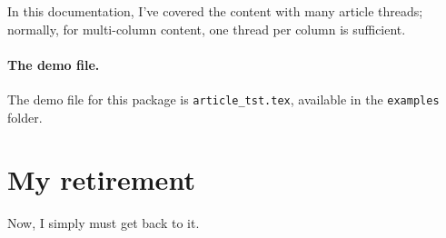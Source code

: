 \documentclass{article}
\begin{document}
\newtopic\noindent In this documentation, I've covered the content with many article threads; normally,
for multi-column content, one thread per column is sufficient.
\begin{multicols}{2} %
\noindent{}\indent
\lipsum[2]

\lipsum[4]

\lipsum[6]

\noindent{}\indent
\lipsum[7]

\lipsum[10]

\lipsum[12]

\noindent{}\indent
\lipsum[14]

\noindent{}\indent
\lipsum[16]

\end{multicols}

\paragraph*{The demo file.} The demo file for this package is \texttt{article\_tst.tex},
available in the \texttt{examples} folder.


\section{My retirement}

Now, I simply must get back to it. \dps
\end{document}
